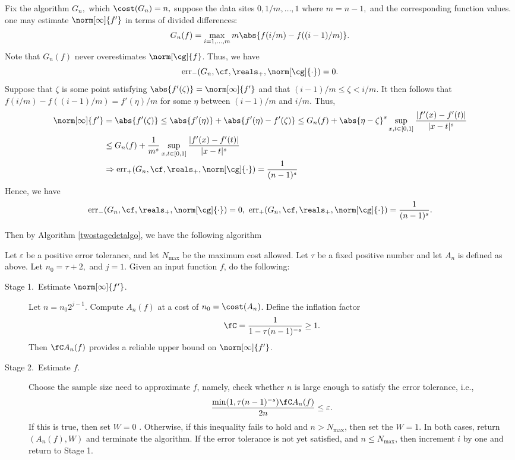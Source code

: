 Fix the algorithm $G_n,$ which $\cost(G_n)=n,$
suppose the data sites $0, 1/m, \dots, 1$ where $m=n-1,$ and the corresponding function values. one may estimate $\norm[\infty]{f'}$ in terms of divided differences:
\begin{equation}
G_{n}(f)= \max_{i=1, \ldots, m} m\abs{f(i/m)-f((i-1)/m)}.
\end{equation}
Note that $G_n(f)$ never overestimates $\norm[\cg]{f}$. Thus, we have
$$\err_{-}(G_n,\cf,\reals_{+},\norm[\cg]{\cdot})=0.$$
 Suppose that $\zeta$ is some point satisfying $\abs{f'(\zeta)} = \norm[\infty]{f'}$ and
that $(i-1)/m \le \zeta < i/m$.  It then follows that $f(i/m)-f((i-1)/m) = f'(\eta)/m$ for some $\eta$ between $(i-1)/m$ and $i/m$.  Thus,
\begin{align*}
\norm[\infty]{f'} &= \abs{f'(\zeta)}\leq \abs{f'(\eta)} + \abs{f'(\eta)-f'(\zeta) }  \le G_{n}(f) + \abs{ \eta-\zeta}^{s}\sup\limits_{x,t \in [0,1]}\frac{|f'(x)-f'(t)|}{|x-t|^{s}}\nonumber\\
& \leq  G_n(f) + \frac{1}{m^{s}} \sup\limits_{x,t \in [0,1]}\frac{|f'(x)-f'(t)|}{|x-t|^{s}}\nonumber\\
&\Rightarrow \err_{+}(G_n,\cf,\reals_{+},\norm[\cg]{\cdot}) =\frac{1}{(n-1)^{s}}
\end{align*}
Hence, we have
$$\err_{-}(G_n,\cf,\reals_{+},\norm[\cg]{\cdot})=0, \ \err_{+}(G_n,\cf,\reals_{+},\norm[\cg]{\cdot}) =\frac{1}{(n-1)^{s}}.
$$

Then by Algorithm \ref{twostagedetalgo}, we have the following algorithm
\begin{algo} \label{adpatalgo}
 Let $\varepsilon$ be a positive error tolerance, and let $N_{\max}$ be the maximum cost allowed.  Let $\tau$ be a fixed positive number and
 let $A_{n}$ is defined as above. Let $n_{0}= \tau+2,$ and $j=1.$ Given an input function $f$, do the following:

\begin{description}
\item[Stage 1.\ Estimate {$\norm[\infty]{f'}$}.] Let $n=n_{0}2^{j-1}.$ Compute $A_n(f)$ at a cost of $n_{0} = \cost(A_n)$.   Define the inflation factor
$$
\fC =\frac{1}{1 - \tau (n-1)^{-s}} \ge 1.
$$
Then $\fC A_{n}(f)$ provides a reliable upper bound on $\norm[\infty]{f'}$.

\item [Stage 2.\ Estimate {$f$}.] Choose the sample size need to approximate $f$, namely, check whether $n$ is large enough to satisfy the error tolerance, i.e.,
\[
\frac{\min(1,\tau (n-1)^{-s})\fC A_{n}(f)}{2n} \le \varepsilon.
\]
If this is true, then set $W=0$ .  Otherwise, if this inequality fails to hold and $n > N_{\max}$, then set the $W=1$.  In both cases, return $(A_{n}(f),W)$ and terminate the algorithm.  If the error tolerance is not yet satisfied, and $n \le N_{\max}$, then increment $i$ by one and return to Stage 1.

\end{description}

\end{algo}

